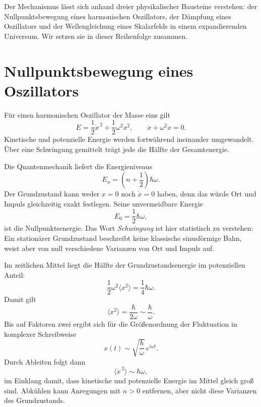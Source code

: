 Der Mechanismus lässt sich anhand dreier physikalischer Bausteine verstehen: der Nullpunktsbewegung eines harmonischen Oszillators, der Dämpfung eines Oszillators und der Wellengleichung eines Skalarfelds in einem expandierenden Universum. Wir setzen sie in dieser Reihenfolge zusammen.

\section{Nullpunktsbewegung eines Oszillators}

Für einen harmonischen Oszillator der Masse eins gilt
\begin{equation}
E=\frac12\dot x^{\,2}+\frac12\omega^2x^2,
\qquad
\ddot x+\omega^2x=0.
\label{eq:c10-undamped}
\end{equation}
Kinetische und potenzielle Energie werden fortwährend ineinander umgewandelt. Über eine Schwingung gemittelt trägt jede die Hälfte der Gesamtenergie.

Die Quantenmechanik liefert die Energieniveaus
\begin{equation}
E_n=\left(n+\frac12\right)\hbar\omega.
\label{eq:c10-oscillator-levels}
\end{equation}
Der Grundzustand kann weder \(x=0\) noch \(\dot x=0\) haben, denn das würde Ort und Impuls gleichzeitig exakt festlegen. Seine unvermeidbare Energie
\[
E_0=\frac12\hbar\omega,
\]
ist die Nullpunktsenergie. Das Wort \emph{Schwingung} ist hier statistisch zu verstehen: Ein stationärer Grundzustand beschreibt keine klassische sinusförmige Bahn, weist aber von null verschiedene Varianzen von Ort und Impuls auf.

Im zeitlichen Mittel liegt die Hälfte der Grundzustandsenergie im potenziellen Anteil:
\[
\frac12\omega^2\langle x^2\rangle
=\frac14\hbar\omega.
\]
Damit gilt
\begin{equation}
\langle x^2\rangle=\frac{\hbar}{2\omega}
\sim\frac{\hbar}{\omega}.
\label{eq:c10-zero-point-position}
\end{equation}
Bis auf Faktoren zwei ergibt sich für die Größenordnung der Fluktuation in komplexer Schreibweise
\[
x(t)\sim\sqrt{\frac{\hbar}{\omega}}\,e^{i\omega t}.
\]
Durch Ableiten folgt dann
\begin{equation}
\langle\dot x^{\,2}\rangle\sim\hbar\omega,
\label{eq:c10-zero-point-velocity}
\end{equation}
im Einklang damit, dass kinetische und potenzielle Energie im Mittel gleich groß sind. Abkühlen kann Anregungen mit \(n>0\) entfernen, aber nicht diese Varianzen des Grundzustands.


